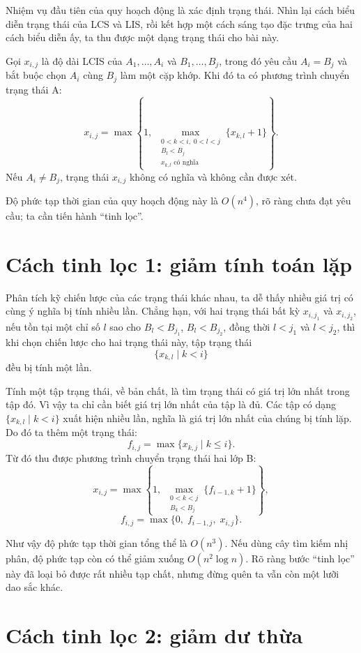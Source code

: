 \documentclass[11pt]{article}
\begin{document}
Nhiệm vụ đầu tiên của quy hoạch động là xác định trạng thái. Nhìn lại cách
biểu diễn trạng thái của LCS và LIS, rồi kết hợp một cách sáng tạo đặc trưng
của hai cách biểu diễn ấy, ta thu được một dạng trạng thái cho bài này.

Gọi $x_{i,j}$ là độ dài LCIS của $A_1,\ldots,A_i$ và $B_1,\ldots,B_j$, trong
đó yêu cầu $A_i=B_j$ và bắt buộc chọn $A_i$ cùng $B_j$ làm một cặp khớp. Khi
đó ta có phương trình chuyển trạng thái A:
\[
  x_{i,j}=
  \max\left\{
    1,\;
    \max_{\substack{0<k<i,\;0<l<j\\ B_l<B_j\\ x_{k,l}\text{ có nghĩa}}}
      \{x_{k,l}+1\}
  \right\}.
\]
Nếu $A_i\ne B_j$, trạng thái $x_{i,j}$ không có nghĩa và không cần được xét.

Độ phức tạp thời gian của quy hoạch động này là $O(n^4)$, rõ ràng chưa đạt yêu
cầu; ta cần tiến hành ``tinh lọc''.

\section{Cách tinh lọc 1: giảm tính toán lặp}

Phân tích kỹ chiến lược của các trạng thái khác nhau, ta dễ thấy nhiều giá trị
có cùng ý nghĩa bị tính nhiều lần. Chẳng hạn, với hai trạng thái bất kỳ
$x_{i,j_1}$ và $x_{i,j_2}$, nếu tồn tại một chỉ số $l$ sao cho
$B_l<B_{j_1}$, $B_l<B_{j_2}$, đồng thời $l<j_1$ và $l<j_2$, thì khi chọn
chiến lược cho hai trạng thái này, tập trạng thái
\[
  \{x_{k,l}\mid k<i\}
\]
đều bị tính một lần.

Tính một tập trạng thái, về bản chất, là tìm trạng thái có giá trị lớn nhất
trong tập đó. Vì vậy ta chỉ cần biết giá trị lớn nhất của tập là đủ. Các tập
có dạng $\{x_{k,l}\mid k<i\}$ xuất hiện nhiều lần, nghĩa là giá trị lớn nhất
của chúng bị tính lặp. Do đó ta thêm một trạng thái:
\[
  f_{i,j}=\max\{x_{k,j}\mid k\le i\}.
\]
Từ đó thu được phương trình chuyển trạng thái hai lớp B:
\[
  x_{i,j}=
  \max\left\{
    1,\;
    \max_{\substack{0<k<j\\ B_k<B_j}}\{f_{i-1,k}+1\}
  \right\},
\]
\[
  f_{i,j}=\max\{0,\;f_{i-1,j},\;x_{i,j}\}.
\]

Như vậy độ phức tạp thời gian tổng thể là $O(n^3)$. Nếu dùng cây tìm kiếm nhị
phân, độ phức tạp còn có thể giảm xuống $O(n^2\log n)$. Rõ ràng bước ``tinh
lọc'' này đã loại bỏ được rất nhiều tạp chất, nhưng đừng quên ta vẫn còn một
lưỡi dao sắc khác.

\section{Cách tinh lọc 2: giảm dư thừa}
\end{document}
